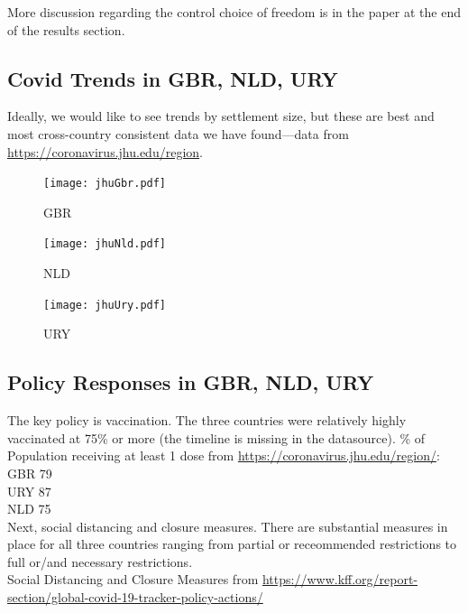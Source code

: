 \documentclass[10pt, letterpaper]{article}
\begin{document}
\begin{spacing}{1.4}
More discussion regarding the control choice of freedom is in the paper at the end of the results section. 

\subsection{Covid Trends in GBR, NLD, URY}

Ideally, we would like to see trends by settlement size, but these are best and most
cross-country consistent data we have found---data from \url{https://coronavirus.jhu.edu/region}.

 \begin{figure}[H]
  \texttt{[image: jhuGbr.pdf]}\centering\label{jhuGbr}
 \caption{GBR}
 \end{figure}

  \begin{figure}[H]
  \texttt{[image: jhuNld.pdf]}\centering\label{jhuNld}
 \caption{NLD}
 \end{figure}

  \begin{figure}[H]
  \texttt{[image: jhuUry.pdf]}\centering\label{jhuUry}
 \caption{URY}
 \end{figure}

\subsection{Policy Responses in GBR, NLD, URY}

The key policy is vaccination. 
The three countries were relatively highly vaccinated at 75\% or more (the
timeline is missing in the datasource). \% of Population receiving at least 1 dose from \url{https://coronavirus.jhu.edu/region/}:\\
GBR 79\\
URY 87\\
NLD 75\\

Next, social distancing and closure measures. There are substantial measures in
place for all three countries ranging from partial or receommended restrictions
to full or/and necessary restrictions.\\

Social Distancing and Closure Measures from \url{https://www.kff.org/report-section/global-covid-19-tracker-policy-actions/}\\


\end{spacing}
\end{document}
